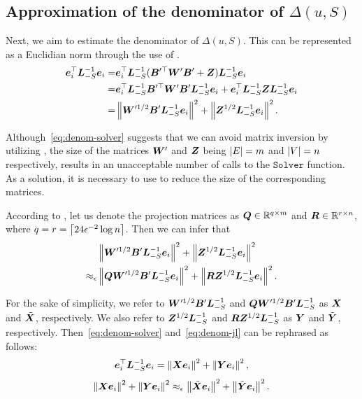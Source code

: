 \documentclass[10pt,twocolumn,twoside]{IEEEtran}
\begin{document}
\subsection{Approximation of the denominator of \(\Delta(u,S)\)}

Next, we aim to estimate the denominator of \(\Delta(u,S)\). This can be represented as a Euclidian norm through the use of .
\begin{equation}\label{eq:denom-solver}
    \begin{split}
        \boldsymbol{e}_i^\top\boldsymbol{L}_{-S}^{-1}\boldsymbol{e}_i
        =&\boldsymbol{e}_i^\top\boldsymbol{L}_{-S}^{-1}(\boldsymbol{B}'^\top\boldsymbol{W}'\boldsymbol{B}'+\boldsymbol{Z})\boldsymbol{L}_{-S}^{-1}\boldsymbol{e}_i\\
        =&\boldsymbol{e}_i^\top\boldsymbol{L}_{-S}^{-1}\boldsymbol{B}'^\top\boldsymbol{W}'\boldsymbol{B}'\boldsymbol{L}_{-S}^{-1}\boldsymbol{e}_i+\boldsymbol{e}_i^\top\boldsymbol{L}_{-S}^{-1}\boldsymbol{Z}\boldsymbol{L}_{-S}^{-1}\boldsymbol{e}_i\\
        =&\left\Vert\boldsymbol{W}'^{1/2}\boldsymbol{B}'\boldsymbol{L}_{-S}^{-1}\boldsymbol{e}_i\right\Vert^2+\left\Vert\boldsymbol{Z}^{1/2}\boldsymbol{L}_{-S}^{-1}\boldsymbol{e}_i\right\Vert^2.
    \end{split}
\end{equation}

Although~\eqref{eq:denom-solver} suggests that we can avoid matrix inversion by utilizing , the size of the matrices \(\boldsymbol{W}'\) and \(\boldsymbol{Z}\) being \(\left|E \right|=m\) and \(\left|V \right|=n\) respectively, results in an unacceptable number of calls to the \(\mathtt{Solver}\) function.
As a solution, it is necessary to use  to reduce the size of the corresponding matrices.

According to , let us denote the projection matrices as \(\boldsymbol{Q}\in\mathbb{R}^{q\times m}\) and \(\boldsymbol{R}\in\mathbb{R}^{r\times n}\), where \(q=r=\left\lceil24\epsilon^{-2}\log n\right\rceil\).
Then we can infer that
\begin{equation}\label{eq:denom-jl}
    \begin{split}
        &\left\Vert\boldsymbol{W}'^{1/2}\boldsymbol{B}'\boldsymbol{L}_{-S}^{-1}\boldsymbol{e}_i\right\Vert^2+\left\Vert\boldsymbol{Z}^{1/2}\boldsymbol{L}_{-S}^{-1}\boldsymbol{e}_i\right\Vert^2\\
        \approx_\epsilon&\left\Vert\boldsymbol{Q}\boldsymbol{W}'^{1/2}\boldsymbol{B}'\boldsymbol{L}_{-S}^{-1}\boldsymbol{e}_i\right\Vert^2+\left\Vert\boldsymbol{R}\boldsymbol{Z}^{1/2}\boldsymbol{L}_{-S}^{-1}\boldsymbol{e}_i\right\Vert^2.
    \end{split}
\end{equation}

For the sake of simplicity, we refer to \(\boldsymbol{W}'^{1/2}\boldsymbol{B}'\boldsymbol{L}_{-S}^{-1}\) and \(\boldsymbol{Q}\boldsymbol{W}'^{1/2}\boldsymbol{B}'\boldsymbol{L}_{-S}^{-1}\) as \(\boldsymbol{X}\) and \(\tilde{\boldsymbol{X}}\), respectively.
We also refer to \(\boldsymbol{Z}^{1/2}\boldsymbol{L}_{-S}^{-1}\) and \(\boldsymbol{R}\boldsymbol{Z}^{1/2}\boldsymbol{L}_{-S}^{-1}\) as \(\boldsymbol{Y}\) and \(\tilde{\boldsymbol{Y}}\), respectively.
Then~\eqref{eq:denom-solver} and~\eqref{eq:denom-jl} can be rephrased as follows:
\begin{equation}\label{eq:denom-solver-simp}
    \boldsymbol{e}_i^\top\boldsymbol{L}_{-S}^{-1}\boldsymbol{e}_i=\left\Vert\boldsymbol{X}\boldsymbol{e}_i\right\Vert^2+\left\Vert\boldsymbol{Y}\boldsymbol{e}_i\right\Vert^2,
\end{equation}
\begin{equation}\label{eq:denom-jl-simp}
    \left\Vert\boldsymbol{X}\boldsymbol{e}_i\right\Vert^2+\left\Vert\boldsymbol{Y}\boldsymbol{e}_i\right\Vert^2\approx_\epsilon\left\Vert\tilde{\boldsymbol{X}}\boldsymbol{e}_i\right\Vert^2+\left\Vert\tilde{\boldsymbol{Y}}\boldsymbol{e}_i\right\Vert^2.
\end{equation}
\end{document}
